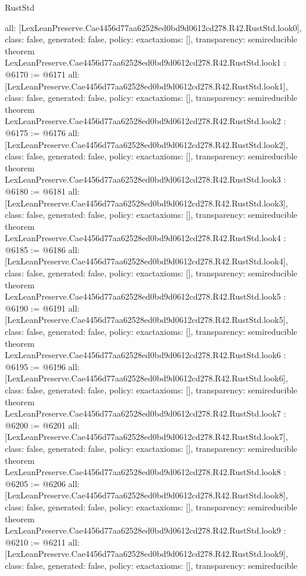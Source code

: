 \begin{lexlean}{RustStd}
\begin{coremodule}
{  all: [LexLeanPreserve.Cae4456d77aa62528ed0bd9d0612cd278.R42.RustStd.look0],
  class: false,
  generated: false,
  policy: exact{axioms: []},
  transparency: semireducible
}
theorem LexLeanPreserve.Cae4456d77aa62528ed0bd9d0612cd278.R42.RustStd.look1 : @6170 := @6171 {
  all: [LexLeanPreserve.Cae4456d77aa62528ed0bd9d0612cd278.R42.RustStd.look1],
  class: false,
  generated: false,
  policy: exact{axioms: []},
  transparency: semireducible
}
theorem LexLeanPreserve.Cae4456d77aa62528ed0bd9d0612cd278.R42.RustStd.look2 : @6175 := @6176 {
  all: [LexLeanPreserve.Cae4456d77aa62528ed0bd9d0612cd278.R42.RustStd.look2],
  class: false,
  generated: false,
  policy: exact{axioms: []},
  transparency: semireducible
}
theorem LexLeanPreserve.Cae4456d77aa62528ed0bd9d0612cd278.R42.RustStd.look3 : @6180 := @6181 {
  all: [LexLeanPreserve.Cae4456d77aa62528ed0bd9d0612cd278.R42.RustStd.look3],
  class: false,
  generated: false,
  policy: exact{axioms: []},
  transparency: semireducible
}
theorem LexLeanPreserve.Cae4456d77aa62528ed0bd9d0612cd278.R42.RustStd.look4 : @6185 := @6186 {
  all: [LexLeanPreserve.Cae4456d77aa62528ed0bd9d0612cd278.R42.RustStd.look4],
  class: false,
  generated: false,
  policy: exact{axioms: []},
  transparency: semireducible
}
theorem LexLeanPreserve.Cae4456d77aa62528ed0bd9d0612cd278.R42.RustStd.look5 : @6190 := @6191 {
  all: [LexLeanPreserve.Cae4456d77aa62528ed0bd9d0612cd278.R42.RustStd.look5],
  class: false,
  generated: false,
  policy: exact{axioms: []},
  transparency: semireducible
}
theorem LexLeanPreserve.Cae4456d77aa62528ed0bd9d0612cd278.R42.RustStd.look6 : @6195 := @6196 {
  all: [LexLeanPreserve.Cae4456d77aa62528ed0bd9d0612cd278.R42.RustStd.look6],
  class: false,
  generated: false,
  policy: exact{axioms: []},
  transparency: semireducible
}
theorem LexLeanPreserve.Cae4456d77aa62528ed0bd9d0612cd278.R42.RustStd.look7 : @6200 := @6201 {
  all: [LexLeanPreserve.Cae4456d77aa62528ed0bd9d0612cd278.R42.RustStd.look7],
  class: false,
  generated: false,
  policy: exact{axioms: []},
  transparency: semireducible
}
theorem LexLeanPreserve.Cae4456d77aa62528ed0bd9d0612cd278.R42.RustStd.look8 : @6205 := @6206 {
  all: [LexLeanPreserve.Cae4456d77aa62528ed0bd9d0612cd278.R42.RustStd.look8],
  class: false,
  generated: false,
  policy: exact{axioms: []},
  transparency: semireducible
}
theorem LexLeanPreserve.Cae4456d77aa62528ed0bd9d0612cd278.R42.RustStd.look9 : @6210 := @6211 {
  all: [LexLeanPreserve.Cae4456d77aa62528ed0bd9d0612cd278.R42.RustStd.look9],
  class: false,
  generated: false,
  policy: exact{axioms: []},
  transparency: semireducible
}
\end{coremodule}
\end{lexlean}
